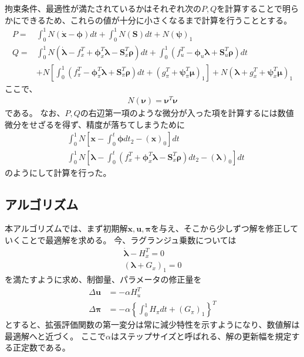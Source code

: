 \documentclass[a4paper]{bxjsarticle}
\begin{document}
	拘束条件、最適性が満たされているかはそれぞれ次の$P,Q$を計算することで明らかにできるため、これらの値が十分に小さくなるまで計算を行うこととする。
	\begin{align}
		P = &\int_{0}^{1} N(\dot{\bm{x}}- \bm{\phi})dt + \int_{0}^{1} N(\bm{S}) dt + N(\bm{\psi})_1 \\		
		Q = &\int_{0}^{1} N(\dot{\bm{\lambda}} - f_x^T + \bm{\phi}^T_x \bm{\lambda}  - \bm{S}_x^T \bm{\rho} )dt + \int_{0}^{1}(f_u^T - \bm{\phi}_u \bm{\lambda + \bm{S}}_u^T \bm{\rho} ) dt \nonumber \\
			  &+N\left[\int_{0}^{1}(f_{\pi}^T - \bm{\phi}_\pi^T \bm{\lambda}+\bm{S}^T_{\pi}\bm{\rho})dt + (g_{\pi}^T+\bm{\psi}^T_{\pi}\bm{\mu})_1\right] + N(\bm{\lambda} + g_x^T + \bm{\psi}_x^T \bm{\mu})_1
	\end{align}
	ここで、
	\begin{align}
		N(\bm{\nu}) = \bm{\nu}^T \bm{\nu}
	\end{align}
	である。
	なお、$P,Q$の右辺第一項のような微分が入った項を計算するには数値微分をせざるを得ず、精度が落ちてしまうために
	\begin{align}
		&\int_{0}^{1} N\left[{\bm{x}}- \int_{0}^{t}\bm{\phi}dt_2 - (\bm{x})_0\right]dt \\
		&\int_{0}^{1} N\left[{\bm{\lambda}} - \int_{0}^{t} (f_x^T + \bm{\phi}^T_x \bm{\lambda}  - \bm{S}_x^T \bm{\rho})dt_2 - (\bm{\lambda})_0 \right]dt
	\end{align}
	のようにして計算を行った。
	
	\subsection{アルゴリズム\cite{scgra,mugitani,harada}}	
	本アルゴリズムでは、まず初期解$\bm{x},\bm{u},\bm{\pi}$を与え、そこから少しずつ解を修正していくことで最適解を求める。
	今、ラグランジュ乗数については
	\begin{align}
		\dot{\bm{\lambda}} - H_x^T = 0\\
		(\bm{\lambda} + G_{x})_1 = 0
	\end{align}
	を満たすように求め、制御量、パラメータの修正量を
	\begin{align}
		\Delta \bm{u} &= - \alpha H_u^T\\
		\Delta \bm{\pi} &= - \alpha \left\{\int_{0}^{1}H_\pi dt + (G_\pi)_1 \right\}^T
	\end{align}
	とすると、拡張評価関数の第一変分は常に減少特性を示すようになり、数値解は最適解へと近づく。
	ここで$\alpha$はステップサイズと呼ばれる、解の更新幅を規定する正定数である。
	
\end{document}
